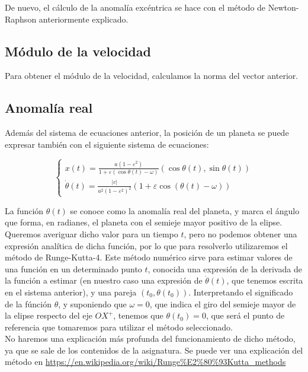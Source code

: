 \documentclass[12pt]{article}
\begin{document}
De nuevo, el cálculo de la anomalía excéntrica se hace con el método
de Newton-Raphson anteriormente explicado.

\subsection{Módulo de la velocidad}

Para obtener el módulo de la velocidad, calculamos la norma del
vector anterior.

\subsection{Anomalía real}

Además del sistema de ecuaciones anterior, la posición de un planeta
se puede expresar también con el siguiente sistema de ecuaciones:

\begin{equation}
  \left\{
    \begin{array}{l}
      x(t) = \frac{a(1 - \varepsilon^2)}{1 + \varepsilon(\cos{\theta(t)} - \omega)}(\cos{\theta(t)}, \sin{\theta(t)})\\
      \dot{\theta}(t) = \frac{|c|}{a^2(1 - \varepsilon^2)^2}(1 + \varepsilon \cos{(\theta(t) - \omega)})
    \end{array}
  \right.
  \label{eq:sist2}
\end{equation}

La función $\theta(t)$ se conoce como la anomalía real del planeta, y
marca el ángulo que forma, en radianes, el planeta con el semieje
mayor positivo de la elipse. Queremos averiguar dicho valor para un
tiempo $t$, pero no podemos obtener una expresión analítica de dicha
función, por lo que para resolverlo utilizaremos el método de
Runge-Kutta-4. Este método numérico sirve para estimar valores de una
función en un determinado punto $t$, conocida una expresión de la
derivada de la función a estimar (en nuestro caso una expresión de
$\dot{\theta}(t)$, que tenemos escrita en el sistema anterior), y una
pareja $(t_0, \theta(t_0))$. Interpretando el significado de la
fúnción $\theta$, y suponiendo que $\omega = 0$, que indica el giro
del semieje mayor de la elipse respecto del eje $OX^{+}$, tenemos que
$\theta(t_0) = 0$, que será el punto de referencia que tomaremos
para utilizar el método seleccionado.\\

No haremos una explicación más profunda del funcionamiento de dicho
método, ya que se sale de los contenidos de la asignatura. Se puede
ver una explicación del método en
\url{https://en.wikipedia.org/wiki/Runge%E2%80%93Kutta_methods}
\end{document}

